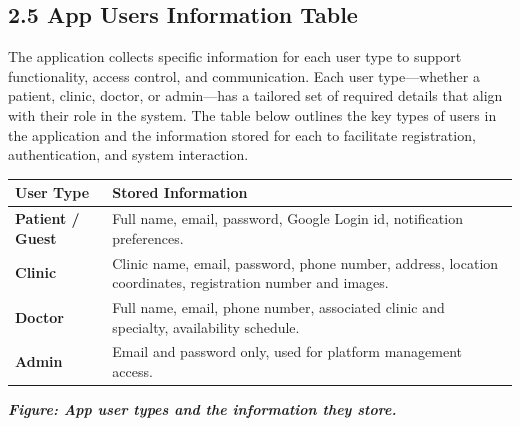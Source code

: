 \documentclass[12pt]{report}
\begin{document}
\subsection*{2.5 App Users Information Table}
\noindent The application collects specific information for each user type to support functionality, access control, and communication. Each user type—whether a patient, clinic, doctor, or admin—has a tailored set of required details that align with their role in the system. The table below outlines the key types of users in the application and the information stored for each to facilitate registration, authentication, and system interaction.
\vspace{0.3cm}
\begin{table}[H]
	\centering
	\renewcommand{\arraystretch}{1.3}
	\begin{tabular}{|p{4cm}|p{11.5cm}|}
		\hline
		\rowcolor[HTML]{C0C0C0}
		\textbf{User Type}                     & \textbf{Stored Information}                                       \\
		\hline

		\hspace{0.5cm}\textbf{Patient / Guest} &
		Full name, email, password, Google Login id, notification preferences.                                     \\
		\hline

		\hspace{1.4cm}\textbf{Clinic}          &
		Clinic name, email, password, phone number, address, location coordinates, registration number and images. \\
		\hline

		\hspace{1.4cm}\textbf{Doctor}          &
		Full name, email, phone number, associated clinic and specialty, availability schedule.                    \\
		\hline

		\hspace{1.4cm}\textbf{Admin}           &
		Email and password only, used for platform management access.                                              \\
		\hline
	\end{tabular}
	\begin{center}
		\vspace{0.5cm}
		\textit{\textbf{Figure: App user types and the information they store.}}
	\end{center}
\end{table}
\end{document}
